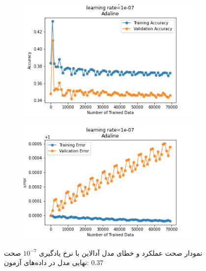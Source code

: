 \documentclass[12pt, a4paper]{article}
\begin{document}
\vspace{1cm}
\begin{figure}[h]
    \begin{subfigure}{0.45\linewidth}
        \centering
        \includegraphics[width=\linewidth]{images/5/adaline/lr/acc_1e-07.png}
    \end{subfigure}
    \hfil
    \begin{subfigure}{0.45\linewidth}
        \centering
        \includegraphics[width=\linewidth]{images/5/adaline/lr/error_1e-07.png}
    \end{subfigure}
    \caption{نمودار صحت عملکرد‌ و خطای مدل آدالاین با نرخ یادگیری $10^{-7}$
    \newline
    صحت نهایی مدل در داده‌های آزمون: $0.37$}
    \label{lkm}
\end{figure}
\vspace{1cm}
\end{document}
